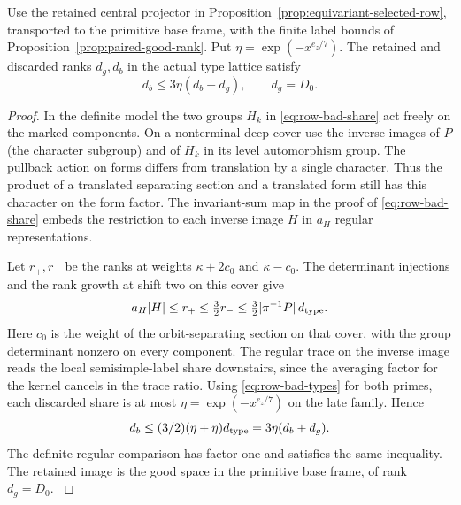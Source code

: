\begin{lemma}
\label{lem:parent-projector-rank-loss}
Use the retained central projector in
Proposition~\ref{prop:equivariant-selected-row}, transported to the
primitive base frame, with the finite label bounds of
Proposition~\ref{prop:paired-good-rank}. Put \(\eta=\exp(-x^{e_z/7})\).
The retained and discarded ranks \(d_g,d_b\) in the actual type lattice satisfy
\[
 d_b\le3\eta(d_b+d_g),\qquad d_g=D_0.
\]

\end{lemma}

\begin{proof}
In the definite model the two groups \(H_k\) in
\eqref{eq:row-bad-share} act freely on the marked components.
On a nonterminal deep cover use the inverse images of \(P\)
(the character subgroup) and of \(H_k\) in its level
automorphism group. The pullback action on forms differs
from translation by a single character. Thus the product of
a translated separating section and a translated form still
has this character on the form factor. The invariant-sum map
in the proof of \eqref{eq:row-bad-share} embeds the restriction
to each inverse image \(H\) in \(a_H\) regular representations.

Let \(r_+,r_-\) be the ranks at weights \(\kappa+2c_0\) and \(\kappa-c_0\). The determinant injections and the rank growth at shift two on this cover give
\[
 a_H|H|\le r_+\le\tfrac32 r_-\le\tfrac32|\pi^{-1}P|\,d_{\rm type}.
\]
Here \(c_0\) is the weight
of the orbit-separating section on that cover, with the group
determinant nonzero on every component. The regular trace on
the inverse image reads the local semisimple-label share
downstairs, since the averaging factor for the kernel cancels
in the trace ratio. Using \eqref{eq:row-bad-types} for both
primes, each discarded share is at most
\(\eta=\exp(-x^{e_z/7})\) on the late family. Hence
\[
   d_b\le (3/2)(\eta+\eta)d_{\rm type}
       =3\eta(d_b+d_g).
\]
The definite regular comparison has factor one and satisfies
the same inequality. The retained image is the good space in
the primitive base frame, of rank \(d_g=D_0\).
\label{cor:parent-cusp-slope-7}
\end{proof}
